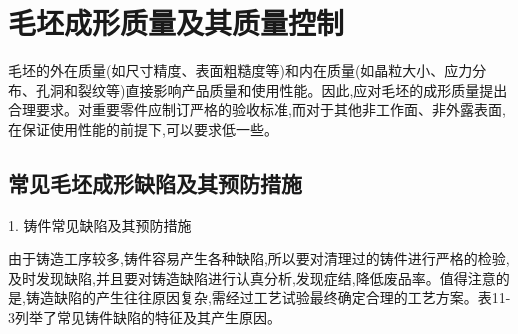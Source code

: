 \documentclass[UTF8]{ctexbook}
\newcommand{\◎}{\ensuremath{\bigcirc}}
\begin{document}
\section{毛坯成形质量及其质量控制}

毛坯的外在质量(如尺寸精度、表面粗糙度等)和内在质量(如晶粒大小、应力分布、孔洞和裂纹等)直接影响产品质量和使用性能。因此,应对毛坯的成形质量提出合理要求。对重要零件应制订严格的验收标准,而对于其他非工作面、非外露表面,在保证使用性能的前提下,可以要求低一些。

\subsection{常见毛坯成形缺陷及其预防措施}

1. 铸件常见缺陷及其预防措施

由于铸造工序较多,铸件容易产生各种缺陷,所以要对清理过的铸件进行严格的检验,及时发现缺陷,并且要对铸造缺陷进行认真分析,发现症结,降低废品率。值得注意的是,铸造缺陷的产生往往原因复杂,需经过工艺试验最终确定合理的工艺方案。表11-3列举了常见铸件缺陷的特征及其产生原因。
\end{document}
